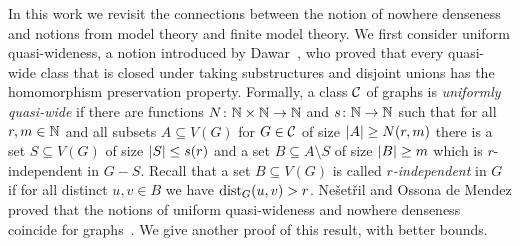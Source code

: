 \begin{comment}
These alternative characterizations have been very useful in 
the design of efficient algorithms. For instance, 
the {\sc{Subgraph Isomorphism}} and {\sc{Homomorphism}} problems 
are fixed-parameter tractable on any nowhere dense
class, parameterized by the size of the pattern graph~\cite{nevsetvril2010first}
and so is the {\sc Distance-$r$ Dominating Set} problem, parameterized
by the size of the solution~\cite{DawarK09}. In fact, 
the {\sc Distance-$r$ Dominating Set} problem admits
polynomial kernels~\cite{siebertz2016polynomial} and even 
almost linear kernels on nowhere dense classes of 
graphs~\cite{eickmeyer2016neighborhood}
(see also~\cite{drange2016kernelization} for the case $r=1$). 
It was shown in~\cite{grohe2014deciding}
that every first-order definable problem can be decided in
almost linear time on any nowhere dense graph class.

It is a natural question to ask for the most general classes of graphs
which admit efficient solutions for certain problems, or to 
classify them into tractable and intractable classes. It was shown 
that for the first-order model-checking problem~\cite{dvovrak2013testing} and for
the {\sc Distance-$r$ Dominating Set} problem~\cite{drange2016kernelization} 
the dividing line for algorithmic tractability 
on subgraph closed classes of graphs is exactly between the
nowhere dense and somewhere dense graph classes. 
\end{comment}


In this work we revisit the connections between the notion of nowhere 
denseness and notions from  model theory and finite model theory.
We first consider uniform quasi-wideness, a
notion  introduced by Dawar~\cite{dawar2010homomorphism}, who 
proved that every quasi-wide class that is closed under taking substructures
and disjoint unions has the homomorphism preservation property. 
Formally, a class $\mathcal{C}$ of graphs is \emph{uniformly quasi-wide} if there are
functions $N\colon \mathbb{N}\times\mathbb{N}\rightarrow \mathbb{N}$ and $s\colon \mathbb{N}\rightarrow \mathbb{N}$ such
that for all $r,m\in \mathbb{N}$ and all subsets $A\subseteq V(G)$ for
$G\in \mathcal{C}$ of size $\left\lvert A\right\rvert\geq N(r,m)$ there is a set
$S\subseteq V(G)$ of size $\left\lvert S\right\rvert\leq s(r)$ and a set
$B\subseteq A\setminus S$ of size $\left\lvert B\right\rvert\geq m$ which is $r$-independent in
$G-S$. Recall that a set $B\subseteq V(G)$ is called {\em{$r$-independent}} in $G$ if for all
distinct $u,v\in B$ we have $\mathrm{dist}_G(u,v)>r$.
 Ne\v{s}et\v{r}il and Ossona de Mendez proved that
the notions of uniform quasi-wideness and nowhere denseness coincide for 
graphs~\cite{nevsetvril2011nowhere}. We give another proof of this result, with better bounds.


